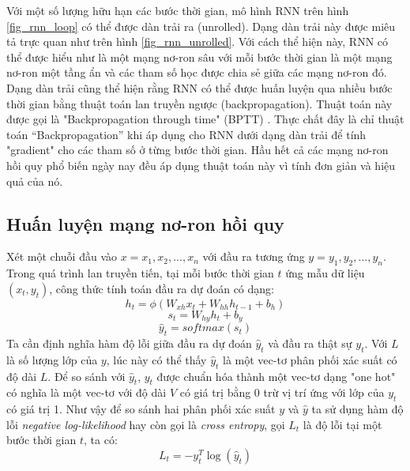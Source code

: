 Với một số lượng hữu hạn các bước thời gian, mô hình RNN trên hình \ref{fig_rnn_loop} có thể được dàn trải ra (unrolled). Dạng dàn trải này được miêu tả trực quan như trên hình \ref{fig_rnn_unrolled}. Với cách thể hiện này, RNN có thể được hiểu như là một mạng nơ-ron sâu với mỗi bước thời gian là một mạng nơ-ron một tầng ẩn và các tham số học được chia sẻ giữa các mạng nơ-ron đó. Dạng dàn trải cũng thể hiện rằng RNN có thể được huấn luyện qua nhiều bước thời gian bằng thuật toán lan truyền ngược (backpropagation). Thuật toán này được gọi là "Backpropagation through time" (BPTT) \cite{werbos1990}. Thực chất đây là chỉ thuật toán “Backpropagation” khi áp dụng cho RNN dưới dạng dàn trải để tính "gradient" cho các tham số ở từng bước thời gian. Hầu hết cả các mạng nơ-ron hồi quy phổ biến ngày nay đều áp dụng thuật toán này vì tính đơn giản và hiệu quả của nó.

\subsection{Huấn luyện mạng nơ-ron hồi quy}

Xét một chuỗi đầu vào $x={x_1,x_2,...,x_n}$ với đầu ra tương ứng $y={y_1,y_2,...,y_n}$. Trong quá trình lan truyền tiến, tại mỗi bước thời gian $t$ ứng mẫu dữ liệu $(x_t, y_t)$, công thức tính toán đầu ra dự đoán có dạng:
\begin{equation} \label{rnnForwardProp1}
	h_t = \phi \left(W_{xh} x_t + W_{hh}h_{t-1} + b_h \right) 
\end{equation}
\begin{equation} \label{rnnForwardProp2}
	s_t = W_{hy} h_t + b_y 
\end{equation}
\begin{equation} \label{rnnForwardProp3}
	\hat{y}_t = softmax (s_t) 
\end{equation}
Ta cần định nghĩa hàm độ lỗi giữa đầu ra dự đoán $\hat{y}_t$ và đầu ra thật sự $y_t$. Với $L$ là số lượng lớp của $y$, lúc này có thể thấy $\hat{y}_t$ là một vec-tơ phân phối xác suất có độ dài $L$. Để so sánh với $\hat{y}_t$, $y_t$ được chuẩn hóa thành một vec-tơ dạng "one hot" có nghĩa là một vec-tơ với độ dài $V$ có giá trị bằng 0 trừ vị trí ứng với lớp của $y_t$ có giá trị 1. Như vậy để so sánh hai phân phối xác suất $y$ và $\hat{y}$ ta sử dụng hàm độ lỗi \textit{negative log-likelihood} hay còn gọi là \textit{cross entropy}, gọi $L_t$ là độ lỗi tại một bước thời gian $t$, ta có:
\begin{equation} \label{errorOfAnExample}
	L_t = -y_t^{T} \log(\hat{y}_t)
\end{equation}

